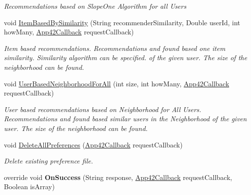 \begin{DoxyCompactItemize}
\begin{DoxyCompactList}\small\item\em Recommendations based on Slope\+One Algorithm for all Users \end{DoxyCompactList}\item 
void \hyperlink{classcom_1_1shephertz_1_1app42_1_1paas_1_1sdk_1_1windows_1_1recommend_1_1_recommender_service_a7ee4e62d82b3f07b4ade9a008e7a6cfd}{Item\+Based\+By\+Similarity} (String recommender\+Similarity, Double user\+Id, int how\+Many, \hyperlink{interfacecom_1_1shephertz_1_1app42_1_1paas_1_1sdk_1_1windows_1_1_app42_callback}{App42\+Callback} request\+Callback)
\begin{DoxyCompactList}\small\item\em Item based recommendations. Recommendations and found based one item similarity. Similarity algorithm can be specified. of the given user. The size of the neighborhood can be found. \end{DoxyCompactList}\item 
void \hyperlink{classcom_1_1shephertz_1_1app42_1_1paas_1_1sdk_1_1windows_1_1recommend_1_1_recommender_service_a1a0a17c6a4267aa27f440c04304de4a0}{User\+Based\+Neighborhood\+For\+All} (int size, int how\+Many, \hyperlink{interfacecom_1_1shephertz_1_1app42_1_1paas_1_1sdk_1_1windows_1_1_app42_callback}{App42\+Callback} request\+Callback)
\begin{DoxyCompactList}\small\item\em User based recommendations based on Neighborhood for All Users. Recommendations and found based similar users in the Neighborhood of the given user. The size of the neighborhood can be found. \end{DoxyCompactList}\item 
void \hyperlink{classcom_1_1shephertz_1_1app42_1_1paas_1_1sdk_1_1windows_1_1recommend_1_1_recommender_service_a1ad2073a306134703877dd9b70991ae7}{Delete\+All\+Preferences} (\hyperlink{interfacecom_1_1shephertz_1_1app42_1_1paas_1_1sdk_1_1windows_1_1_app42_callback}{App42\+Callback} request\+Callback)
\begin{DoxyCompactList}\small\item\em Delete existing preference file. \end{DoxyCompactList}\item 
\hypertarget{classcom_1_1shephertz_1_1app42_1_1paas_1_1sdk_1_1windows_1_1recommend_1_1_recommender_service_a31c1d53782046f9a9750710804cc8671}{override void {\bfseries On\+Success} (String response, \hyperlink{interfacecom_1_1shephertz_1_1app42_1_1paas_1_1sdk_1_1windows_1_1_app42_callback}{App42\+Callback} request\+Callback, Boolean is\+Array)}\label{classcom_1_1shephertz_1_1app42_1_1paas_1_1sdk_1_1windows_1_1recommend_1_1_recommender_service_a31c1d53782046f9a9750710804cc8671}


\end{DoxyCompactItemize}

